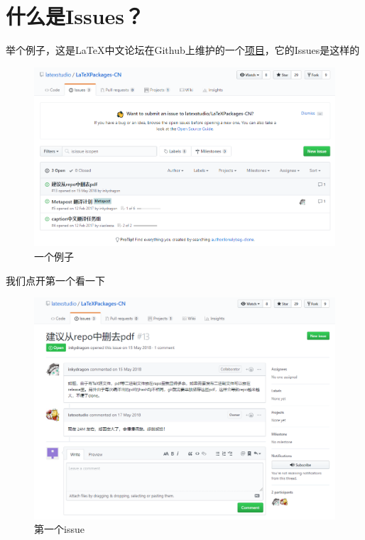\documentclass[UTF8,oneside]{ctexbook}
\begin{document}
\section{什么是Issues？}
举个例子，这是\LaTeX 中文论坛在Github上维护的一个\href{https://github.com/latexstudio/LaTeXPackages-CN}{项目}，它的Issues是这样的
\begin{figure}[H]
	\centering
	\includegraphics[width=1\linewidth]{Pics/latexcn.png}
	\vspace{-0.3cm}
	\caption{一个例子}\label{fig:latexcn}
\end{figure}

我们点开第一个看一下
\begin{figure}[H]
	\centering
	\includegraphics[width=1\linewidth]{Pics/latexcn2.png}
	\vspace{-0.3cm}
	\caption{第一个issue}\label{fig:latexcn1}
\end{figure}
\end{document}
